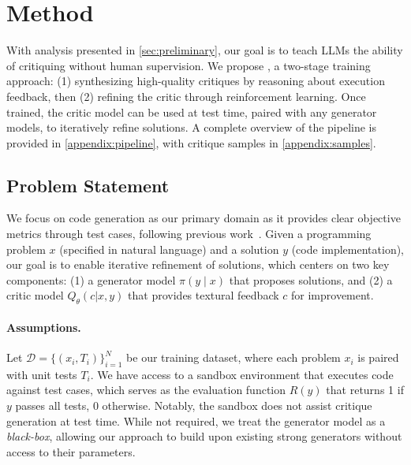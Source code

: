 \section{Method}
With analysis presented in \cref{sec:preliminary}, our goal is to teach LLMs the ability of critiquing without human supervision.
We propose {\ours}, a two-stage training approach: (1) synthesizing high-quality critiques by reasoning about execution feedback, then (2) refining the critic through reinforcement learning.
Once trained, the critic model can be used at test time, paired with any generator models, to iteratively refine solutions.
A complete overview of the pipeline is provided in \cref{appendix:pipeline}, with critique samples in \cref{appendix:samples}.

\subsection{Problem Statement}
We focus on code generation as our primary domain as it provides clear objective metrics through test cases, following previous work~\cite{mcaleese2024llm}.
Given a programming problem $x$ (specified in natural language) and a solution $y$ (code implementation), our goal is to enable iterative refinement of solutions, which centers on two key components: (1) a generator model $\pi(y \mid x)$ that proposes solutions, and (2) a critic model $Q_\theta(c|x,y)$ that provides textural feedback $c$ for improvement.

\paragraph{Assumptions.}
Let $\mathcal{D} = \{(x_i, T_i)\}_{i=1}^N$ be our training dataset, where each problem $x_i$ is paired with unit tests $T_i$.
We have access to a sandbox environment that executes code against test cases, which serves as the evaluation function $R(y)$ that returns 1 if $y$ passes all tests, 0 otherwise.
Notably, the sandbox does not assist critique generation at test time.
While not required, we treat the generator model as a \emph{black-box}, allowing our approach to build upon existing strong generators without access to their parameters.


